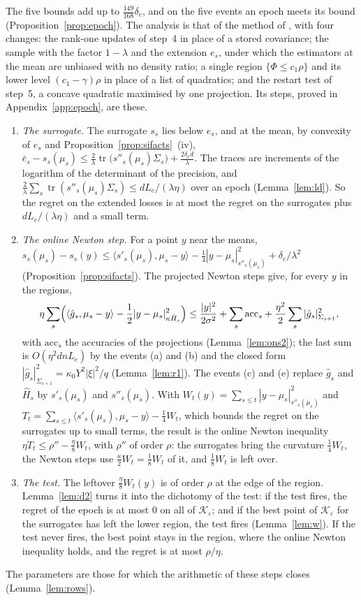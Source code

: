 \documentclass[11pt]{amsart}
\theoremstyle{definition}
\numberwithin{equation}{section}
\newcommand{\cK}{\mathcal{K}}
\newcommand{\tr}{\operatorname{tr}}
\newcommand{\ip}[1]{\langle #1\rangle}
\begin{document}
The five bounds add up to $\frac{149}{168}\delta_e$, and on the five events an epoch meets its bound (Proposition~\ref{prop:epoch}). The analysis is that of the method of \cite[Chapter~11]{Lat24}, with four changes: the rank-one updates of step~4 in place of a stored covariance; the sample with the factor $1-\lambda$ and the extension $e_s$, under which the estimators at the mean are unbiased with no density ratio; a single region $\{\Phi\le c_1\rho\}$ and its lower level $(c_1-\gamma)\rho$ in place of a list of quadratics; and the restart test of step~5, a concave quadratic maximised by one projection. Its steps, proved in Appendix~\ref{app:epoch}, are these.
\begin{enumerate}[label=(\arabic*)]
\item \emph{The surrogate.} The surrogate $s_s$ lies below $e_s$, and at the mean, by convexity of $e_s$ and Proposition~\ref{prop:sifacts}~(iv), $\bar e_s-s_s(\mu_s)\le\frac2\lambda\tr\bigl(s''_s(\mu_s)\Sigma_s\bigr)+\frac{2\delta_ed}\lambda$. The traces are increments of the logarithm of the determinant of the precision, and $\frac2\lambda\sum_s\tr(s''_s(\mu_s)\Sigma_s)\le dL_e/(\lambda\eta)$ over an epoch (Lemma~\ref{lem:ld}). So the regret on the extended losses is at most the regret on the surrogates plus $dL_e/(\lambda\eta)$ and a small term.
\item \emph{The online Newton step.} For a point $y$ near the means, $s_s(\mu_s)-s_s(y)\le\ip{s'_s(\mu_s),\mu_s-y}-\frac14|y-\mu_s|^2_{s''_s(\mu_s)}+\delta_e/\lambda^2$ (Proposition~\ref{prop:sifacts}). The projected Newton steps give, for every $y$ in the regions,
\[
\eta\sum_s\Bigl(\ip{\hat g_s,\mu_s-y}-\frac12|y-\mu_s|^2_{\kappa\hat H_s}\Bigr)\le\frac{|y|^2}{2\sigma^2}+\sum_s\mathrm{acc}_s+\frac{\eta^2}2\sum_s|\hat g_s|^2_{\Sigma_{s+1}},
\]
with $\mathrm{acc}_s$ the accuracies of the projections (Lemma~\ref{lem:ons2}); the last sum is $O(\eta^2dnL_e)$ by the events (a) and (b) and the closed form $|\hat g_s|^2_{\Sigma_{s+1}}=\kappa_0Y^2|\xi|^2/q$ (Lemma~\ref{lem:r1}). The events (c) and (e) replace $\hat g_s$ and $\hat H_s$ by $s'_s(\mu_s)$ and $s''_s(\mu_s)$. With $W_t(y)=\sum_{s\le t}|y-\mu_s|^2_{s''_s(\mu_s)}$ and $T_t=\sum_{s\le t}\ip{s'_s(\mu_s),\mu_s-y}-\frac14W_t$, which bounds the regret on the surrogates up to small terms, the result is the online Newton inequality $\eta T_t\le\rho''-\frac\eta8W_t$, with $\rho''$ of order $\rho$: the surrogates bring the curvature $\frac14W_t$, the Newton steps use $\frac\kappa2W_t=\frac18W_t$ of it, and $\frac18W_t$ is left over.
\item \emph{The test.} The leftover $\frac\eta8W_t(y)$ is of order $\rho$ at the edge of the region. Lemma~\ref{lem:d2} turns it into the dichotomy of the test: if the test fires, the regret of the epoch is at most $0$ on all of $\cK_\varepsilon$; and if the best point of $\cK_\varepsilon$ for the surrogates has left the lower region, the test fires (Lemma~\ref{lem:w}). If the test never fires, the best point stays in the region, where the online Newton inequality holds, and the regret is at most $\rho/\eta$.
\end{enumerate}
The parameters are those for which the arithmetic of these steps closes (Lemma~\ref{lem:rows}).
\end{document}
